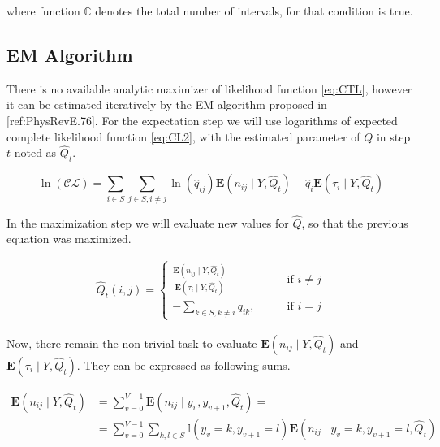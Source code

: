 \documentclass[thesis=M,english]{FITthesis}[2012/10/20]
\newcommand{\matr}[1]{\mathbf{#1}}
\begin{document}
where function $\mathbb{C}$ denotes the total number of intervals, for that condition is true.
    
    
\subsection{EM Algorithm} 

There is no available analytic maximizer of likelihood function \eqref{eq:CTL}, however it can be estimated iteratively by the EM algorithm proposed in [ref:PhysRevE.76].  
For the expectation step we will use logarithms of expected complete likelihood function \eqref{eq:CL2}, with the estimated parameter of $Q$ in step $t$ noted as $\hat Q_t $.

\begin{equation}\label{eq:EMCL}
 \ln( \mathcal{CL} ) = \sum_{i \in S} \sum_{j \in S, i \neq j} \ln( \hat q_{ij}) \mathbf{E}( n_{ij} \mid Y, \hat Q_t ) - \hat q_i \mathbf{E}( \tau_i \mid Y, \hat Q_t )
\end{equation}

In the maximization step we will evaluate new values for $\hat Q$, so that the previous equation was maximized. 

\begin{equation}
\begin{aligned}  
\hat Q_t(i,j)= 
\begin{cases}
\frac{ \mathbf{E}(n_{ij} \mid Y, \hat Q_t )}{ \mathbf{E}( \tau_i \mid Y, \hat Q_t ) } & \text{if } i\neq j\\
- \sum\limits_{k \in S ,k \neq i} q_{ik}, \qquad & \text{if } i=j
\end{cases}
\end{aligned}
\end{equation}

Now, there remain the non-trivial task to evaluate $\mathbf{E}( n_{ij} \mid Y, \hat Q_t )$ and $\mathbf{E}( \tau_i \mid Y, \hat Q_t )$. They can be expressed as following sums.


\begin{equation}
\begin{aligned}  
\mathbf{E}(n_{ij} \mid Y, \hat Q_t ) &= \sum_{v=0}^{V-1} \mathbf{E}(n_{ij} \mid y_v, y_{v+1}, \hat Q_t ) = \\
&= \sum_{v=0}^{V-1} \sum_{k,l \in S} \mathbb{I}( y_v = k, y_{v+1} = l ) \mathbf{E}(n_{ij} \mid y_v = k, y_{v+1} = l, \hat Q_t )
\end{aligned}
\end{equation}
\end{document}
